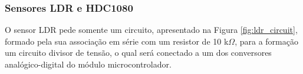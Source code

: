 


\subsubsection{Sensores LDR e HDC1080}

O sensor LDR pede somente um circuito, apresentado na Figura \ref{fig:ldr_circuit}, formado pela sua associação em série com um resistor de 10 k$\Omega$, para a formação um circuito divisor de tensão, o qual será conectado a um dos conversores analógico-digital do módulo microcontrolador.


    \begin{figure}[h!]
            \captionsetup{width=7cm}
   \end{figure}  

